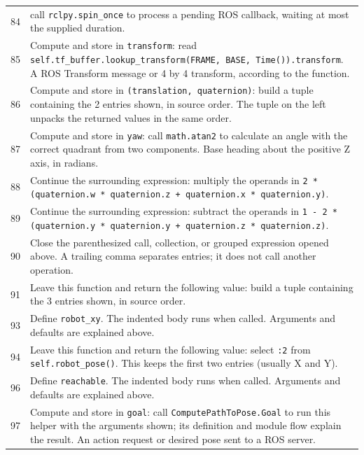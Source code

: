 \documentclass[11pt,a4paper]{book}
\begin{document}
\begin{longtable}{r p{}}
84 & call \texttt{rclpy.spin\_once} to process a pending ROS callback, waiting at most the supplied duration. \\

85 & Compute and store in \texttt{transform}: read \texttt{self.tf\_buffer.lookup\_transform(FRAME, BASE, Time()).transform}. A ROS Transform message or 4 by 4 transform, according to the function. \\

86 & Compute and store in \texttt{(translation, quaternion)}: build a tuple containing the 2 entries shown, in source order. The tuple on the left unpacks the returned values in the same order. \\

87 & Compute and store in \texttt{yaw}: call \texttt{math.atan2} to calculate an angle with the correct quadrant from two components. Base heading about the positive Z axis, in radians. \\

88 & Continue the surrounding expression: multiply the operands in \texttt{2 * (quaternion.w * quaternion.z + quaternion.x * quaternion.y)}. \\

89 & Continue the surrounding expression: subtract the operands in \texttt{1 - 2 * (quaternion.y * quaternion.y + quaternion.z * quaternion.z)}. \\

90 & Close the parenthesized call, collection, or grouped expression opened above. A trailing comma separates entries; it does not call another operation. \\

91 & Leave this function and return the following value: build a tuple containing the 3 entries shown, in source order. \\

93 & Define \texttt{robot\_xy}. The indented body runs when called. Arguments and defaults are explained above. \\

94 & Leave this function and return the following value: select \texttt{:2} from \texttt{self.robot\_pose()}. This keeps the first two entries (usually X and Y). \\

96 & Define \texttt{reachable}. The indented body runs when called. Arguments and defaults are explained above. \\

97 & Compute and store in \texttt{goal}: call \texttt{ComputePathToPose.Goal} to run this helper with the arguments shown; its definition and module flow explain the result. An action request or desired pose sent to a ROS server. \\


\end{longtable}
\end{document}
